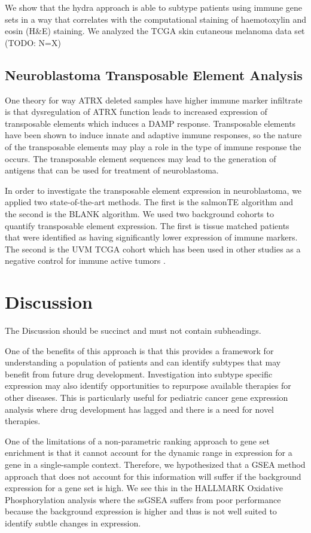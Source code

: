 \documentclass[fleqn,10pt]{wlscirep}
\begin{document}
We show that the hydra approach is able to subtype patients using immune gene sets in a way that correlates with the computational staining of haemotoxylin and eosin (H\&E) staining. We analyzed the TCGA skin cutaneous melanoma data set (TODO: N=X)

\subsection*{Neuroblastoma Transposable Element Analysis}
One theory for way ATRX deleted samples have higher immune marker infiltrate is that dysregulation of ATRX function leads to increased expression of transposable elements which induces a DAMP response. Transposable elements have been shown to induce innate and adaptive immune responses, so the nature of the transposable elements may play a role in the type of immune response the occurs. The transposable element sequences may lead to the generation of antigens that can be used for treatment of neuroblastoma. 

In order to investigate the transposable element expression in neuroblastoma, we applied two state-of-the-art methods. The first is the salmonTE algorithm and the second is the BLANK algorithm. We used two background cohorts to quantify transposable element expression. The first is tissue matched patients that were identified as having significantly lower expression of immune markers. The second is the UVM TCGA cohort which has been used in other studies as a negative control for immune active tumors \cite{bindea2013spatiotemporal,thorsson2018immune}.


\section*{Discussion}

The Discussion should be succinct and must not contain subheadings.

One of the benefits of this approach is that this provides a framework for understanding a population of patients and can identify subtypes that may benefit from future drug development. Investigation into subtype specific expression may also identify opportunities to repurpose available therapies for other diseases. This is particularly useful for pediatric cancer gene expression analysis where drug development has lagged and there is a need for novel therapies. 

One of the limitations of a non-parametric ranking approach to gene set enrichment is that it cannot account for the dynamic range in expression for a gene in a single-sample context. Therefore, we hypothesized that a GSEA method approach that does not account for this information will suffer if the background expression for a gene set is high. We see this in the HALLMARK Oxidative Phosphorylation analysis where the ssGSEA suffers from poor performance because the background expression is higher and thus is not well suited to identify subtle changes in expression.
\end{document}
